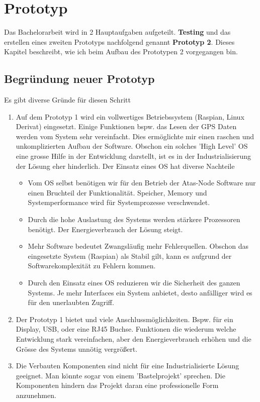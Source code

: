 \documentclass[11pt,english,german]{report}
\theoremstyle{definition}
\begin{document}
\chapter{Prototyp}
Das Bachelorarbeit wird in 2 Hauptaufgaben aufgeteilt.\textbf{ Testing} und das erstellen eines zweiten Prototyps nachfolgend genannt \textbf{Prototyp 2}. Dieses Kapitel beschreibt, wie ich beim Aufbau des Prototypen 2 vorgegangen bin.

\section{Begründung neuer Prototyp}
Es gibt diverse Gründe für diesen Schritt
\begin{enumerate}
	\item Auf dem Prototyp 1 wird ein vollwertiges Betriebssystem (Raspian, Linux Derivat) eingesetzt. Einige Funktionen bspw. das Lesen der GPS Daten werden vom System sehr vereinfacht. Dies ermöglichte mir einen raschen und unkomplizierten Aufbau der Software. Obschon ein solches 'High Level' OS eine grosse Hilfe in der Entwicklung darstellt, ist es in der Industrialisierung der Lösung eher hinderlich. Der Einsatz eines OS hat diverse Nachteile
	\begin{itemize}
		\item Vom OS selbst benötigen wir für den Betrieb der Atas-Node Software nur einen Bruchteil der Funktionalität. Speicher, Memory und Systemperformance wird für Systemprozesse verschwendet. 
		\item Durch die hohe Auslastung des Systems werden stärkere Prozessoren benötigt. Der Energieverbrauch der Lösung steigt.
		\item Mehr Software bedeutet Zwangsläufig mehr Fehlerquellen. Obschon das eingesetzte System (Raspian) als Stabil gilt, kann es aufgrund der Softwarekomplexität zu Fehlern kommen.
		\item Durch den Einsatz eines OS reduzieren wir die Sicherheit des ganzen Systems. Je mehr Interfaces ein System anbietet, desto anfälliger wird es für den unerlaubten Zugriff.
	\end{itemize}
	\item Der Prototyp 1 bietet und viele Anschlussmöglichkeiten. Bspw. für ein Display, USB, oder eine RJ45 Buchse. Funktionen die wiederum welche Entwicklung stark vereinfachen, aber den Energieverbrauch erhöhen und die Grösse des Systems unnötig vergrößert. 
	\item Die Verbauten Komponenten sind nicht für eine Industrialisierte Lösung geeignet. Man könnte sogar von einem 'Bastelprojekt' sprechen. Die Komponenten hindern das Projekt daran eine professionelle Form anzunehmen.
\end{enumerate}
\end{document}
